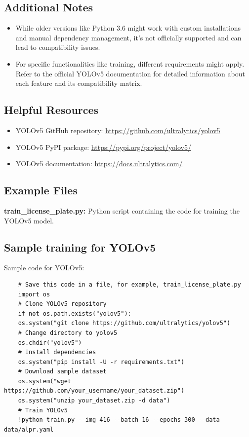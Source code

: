 \subsection*{Additional Notes}
\begin{itemize}[label=--]
	\item While older versions like Python 3.6 might work with custom installations and manual dependency management, it's not officially supported and can lead to compatibility issues.
	\item For specific functionalities like training, different requirements might apply. Refer to the official YOLOv5 documentation for detailed information about each feature and its compatibility matrix.
\end{itemize}

\subsection*{Helpful Resources}
\begin{itemize}[label=--]
	\item YOLOv5 GitHub repository: \url{https://github.com/ultralytics/yolov5}
	\item YOLOv5 PyPI package: \url{https://pypi.org/project/yolov5/}
	\item YOLOv5 documentation: \url{https://docs.ultralytics.com/}
\end{itemize}

\subsection{Example Files}
\textbf{train\_license\_plate.py:} Python script containing the code for training the YOLOv5 model.
\subsection{Sample training for YOLOv5}
Sample code for YOLOv5:
\begin{lstlisting}
	# Save this code in a file, for example, train_license_plate.py
	import os
	# Clone YOLOv5 repository
	if not os.path.exists("yolov5"):
	os.system("git clone https://github.com/ultralytics/yolov5")
	# Change directory to yolov5
	os.chdir("yolov5")
	# Install dependencies
	os.system("pip install -U -r requirements.txt")
	# Download sample dataset 
	os.system("wget https://github.com/your_username/your_dataset.zip")
	os.system("unzip your_dataset.zip -d data")
	# Train YOLOv5
	!python train.py --img 416 --batch 16 --epochs 300 --data data/alpr.yaml
\end{lstlisting}
